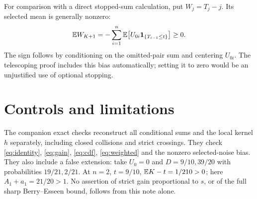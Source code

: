\documentclass[11pt]{article}
\begin{document}
For comparison with a direct stopped-sum calculation, put $W_j=T_j-j$.
Its selected mean is generally nonzero:
\[
 \mathbb E W_{K+1}=-\sum_{i=1}^n
   \mathbb E\!\left[U_{0i}\mathbf1_{\{T_{i-1}\le t\}}\right]\ge0.
\]
The sign follows by conditioning on the omitted-pair sum and centering
$U_{0i}$. The telescoping proof includes this bias automatically; setting
it to zero would be an unjustified use of optional stopping.

\section*{Controls and limitations}
The companion exact checks reconstruct all conditional sums and the local
kernel $h$ separately, including closed collisions and strict crossings.
They check \eqref{eq:identity}, \eqref{eq:gain}, \eqref{eq:cdf}, \eqref{eq:weighted} and the
nonzero selected-noise bias. They also include a false extension: take
$U_0=0$ and $D=9/10,39/20$ with probabilities $19/21,2/21$.
At $n=2$, $t=9/10$, $\mathbb E K-t=1/210>0$; here $A_1+a_1=21/20>1$.
No assertion of strict gain proportional to $s$, or of the full sharp
Berry--Esseen bound, follows from this note alone.
\end{document}
